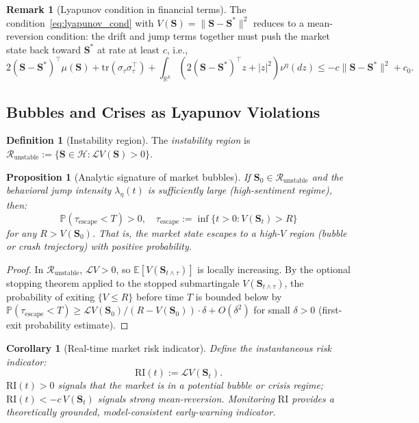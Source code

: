 \documentclass[12pt,a4paper]{article}
\theoremstyle{plain}
\newtheorem{proposition}[theorem]{Proposition}
\newtheorem{corollary}[theorem]{Corollary}
\theoremstyle{definition}
\newtheorem{definition}[theorem]{Definition}
\newtheorem{remark}[theorem]{Remark}
\newcommand{\R}{\mathbb{R}}
\newcommand{\E}{\mathbb{E}}
\newcommand{\PP}{\mathbb{P}}
\newcommand{\Hil}{\mathcal{H}}
\newcommand{\tr}{\mathrm{tr}}
\newcommand{\1}{\mathbbm{1}}
\begin{document}
\begin{remark}[Lyapunov condition in financial terms]
The condition~\eqref{eq:lyapunov_cond} with $V(\mathbf{S}) = \|\mathbf{S} - \mathbf{S}^*\|^2$
reduces to a mean-reversion condition: the drift and jump terms together must
push the market state back toward $\mathbf{S}^*$ at rate at least $c$, i.e.,
\[
2(\mathbf{S}-\mathbf{S}^*)^\top\mu(\mathbf{S})
+ \tr(\sigma_\tau\sigma_\tau^\top)
+ \int_{\R^k}\left(2(\mathbf{S}-\mathbf{S}^*)^\top z + |z|^2\right)\nu^\eta(dz)
\leq -c\|\mathbf{S}-\mathbf{S}^*\|^2 + c_0.
\]
\end{remark}

\subsection{Bubbles and Crises as Lyapunov Violations}

\begin{definition}[Instability region]
The \emph{instability region} is $\mathcal{R}_{\mathrm{unstable}}
:= \{\mathbf{S} \in \Hil : \mathcal{L}V(\mathbf{S}) > 0\}$.
\end{definition}

\begin{proposition}[Analytic signature of market bubbles]
\label{prop:bubble}
If $\mathbf{S}_0 \in \mathcal{R}_{\mathrm{unstable}}$ and the behavioral jump
intensity $\lambda_\eta(t)$ is sufficiently large (high-sentiment regime), then:
\[
\PP\!\left(\tau_{\mathrm{escape}} < T\right) > 0,
\quad \tau_{\mathrm{escape}} := \inf\{t > 0 : V(\mathbf{S}_t) > R\}
\]
for any $R > V(\mathbf{S}_0)$.  That is, the market state escapes to a
high-$V$ region (bubble or crash trajectory) with positive probability.
\end{proposition}

\begin{proof}
In $\mathcal{R}_{\mathrm{unstable}}$, $\mathcal{L}V > 0$, so
$\E[V(\mathbf{S}_{t\wedge\tau})]$ is locally increasing. By the optional
stopping theorem applied to the stopped submartingale
$V(\mathbf{S}_{t\wedge\tau})$, the probability of exiting $\{V \leq R\}$
before time $T$ is bounded below by
$\PP(\tau_{\mathrm{escape}} < T) \geq
\mathcal{L}V(\mathbf{S}_0)/(R - V(\mathbf{S}_0)) \cdot \delta + O(\delta^2)$
for small $\delta > 0$ (first-exit probability estimate).
\end{proof}

\begin{corollary}[Real-time market risk indicator]
Define the instantaneous risk indicator:
\[
\mathrm{RI}(t) := \mathcal{L}V(\mathbf{S}_t).
\]
$\mathrm{RI}(t) > 0$ signals that the market is in a potential bubble
or crisis regime; $\mathrm{RI}(t) < -c\,V(\mathbf{S}_t)$ signals strong
mean-reversion. Monitoring $\mathrm{RI}$ provides a theoretically
grounded, model-consistent early-warning indicator.
\end{corollary}
\end{document}
